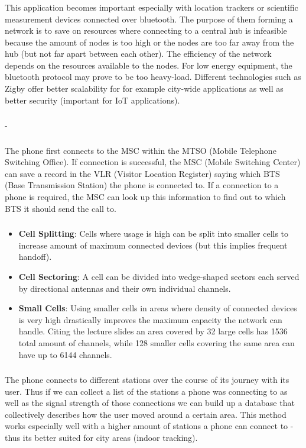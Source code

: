 \documentclass[12pt]{article}
\newcommand{\multipartexercise}{\addtocounter{subsection}{1}\setcounter{subsubsection}{0}}
\newcommand{\exercisepart}{\subsubsection{}}
\begin{document}
\exercisepart
This application becomes important especially with location trackers or scientific measurement devices connected over bluetooth. The purpose of them forming a network is to save on resources where connecting to a central hub is infeasible because the amount of nodes is too high or the nodes are too far away from the hub (but not far apart between each other). The efficiency of the network depends on the resources available to the nodes. For low energy equipment, the bluetooth protocol may prove to be too heavy-load. Different technologies such as Zigby offer better scalability for for example city-wide applications as well as better security (important for IoT applications).

\multipartexercise
\exercisepart -

\exercisepart
The phone first connects to the MSC within the MTSO (Mobile Telephone Switching Office). If connection is successful, the MSC (Mobile Switching Center) can save a record in the VLR (Visitor Location Register) saying which BTS (Base Transmission Station) the phone is connected to. If a connection to a phone is required, the MSC can look up this information to find out to which BTS it should send the call to.

\exercisepart

\begin{itemize}
  \item \textbf{Cell Splitting}: Cells where usage is high can be split into smaller cells to increase amount of maximum connected devices (but this implies frequent handoff).
  \item \textbf{Cell Sectoring}: A cell can be divided into wedge-shaped sectors each served by directional antennas and their own individual channels.
  \item \textbf{Small Cells}: Using smaller cells in areas where density of connected devices is very high drastically improves the maximum capacity the network can handle. Citing the lecture slides an area covered by 32 large cells has 1536 total amount of channels, while 128 smaller cells covering the same area can have up to 6144 channels.
\end{itemize}

\multipartexercise
\exercisepart
The phone connects to different stations over the course of its journey with its user. Thus if we can collect a list of the stations a phone was connecting to as well as the signal strength of those connections we can build up a database that collectively describes how the user moved around a certain area. This method works especially well with a higher amount of stations a phone can connect to - thus its better suited for city areas (indoor tracking).
\end{document}
